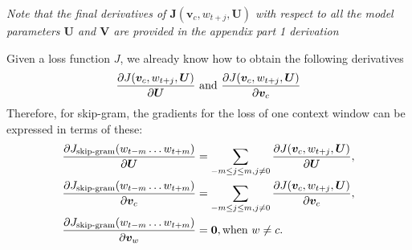 \begin{enumerate}
        \textit{ Note that the final derivatives of $\bm J(\bm v_c, w_{t+j}, \bm U)$ with respect to all the model parameters $\bm U$ and $\bm V$ are provided in the appendix part 1 derivation} 
        
        \begin{answer}
            Given a loss function $J$, we already know how to obtain the following derivatives
            \begin{equation*}
                {\partial J(\bm v_c, w_{t+j}, \bm U) \over \partial \bm U} \textrm{ and } {\partial J(\bm v_c, w_{t+j}, \bm U) \over \partial \bm v_c}
            \end{equation*}
            Therefore, for skip-gram, the gradients for the loss of one context window can be expressed in terms of these:
            \begin{align*}
                {\partial J_{\textrm{skip-gram}}(w_{t-m}\ldots w_{t+m}) \over \partial \bm U} &= \sum_{-m \le j \le m, j\ne 0} {\partial J(\bm v_c, w_{t+j}, \bm U) \over \partial \bm U},\\
                {\partial J_{\textrm{skip-gram}}(w_{t-m}\ldots w_{t+m}) \over \partial \bm v_c} &= \sum_{-m \le j \le m, j\ne 0} {\partial J(\bm v_c, w_{t+j}, \bm U) \over \partial \bm v_c},\\
                {\partial J_{\textrm{skip-gram}}(w_{t-m}\ldots w_{t+m}) \over \partial \bm v_{w}} &= \bm 0, \textrm{when } w \ne c.
            \end{align*}
        \end{answer}
\end{enumerate}